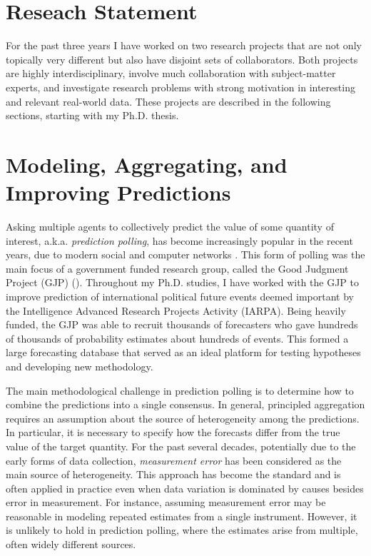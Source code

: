 \documentclass[10pt,twoside]{article}
\theoremstyle{definition}
\theoremstyle{definition}
\begin{document}
\pagestyle{myheadings}
\thispagestyle{empty}

\section*{Reseach Statement}
\vspace{1em}
For the past three years I have worked on two research projects that are not only topically very different but also have disjoint sets of collaborators. Both projects are highly interdisciplinary, involve much collaboration with subject-matter experts, and investigate research problems with strong motivation in  interesting and relevant real-world data. These projects are described in the following sections, starting with my Ph.D. thesis.

 \vspace{-0.8em}
\section{Modeling, Aggregating, and Improving Predictions}  \vspace{-0.8em}
Asking multiple agents to collectively predict the value of some quantity of interest, a.k.a. \textit{prediction polling}, has become increasingly popular in the recent years, due to modern social and computer networks \citep{goel2010prediction, mellers2014psychological}.
This form of polling was the main focus of a government funded research group, called the Good Judgment Project (GJP) (\citealt{ungar2012good, mellers2014psychological}). Throughout my Ph.D. studies, I have worked with the GJP to improve prediction of international political future events deemed important by the Intelligence Advanced Research Projects Activity (IARPA). 
Being heavily funded, the GJP was able to recruit thousands of forecasters who gave hundreds of thousands of probability estimates about hundreds of events. This formed a large forecasting database that served as an ideal platform for testing hypotheses and developing new methodology. 


The main methodological challenge in prediction polling is to determine how to combine the predictions into a single consensus. In general, principled aggregation requires an assumption about the source of heterogeneity among the predictions.
In particular, it is necessary to specify how the forecasts differ from the true value of the target quantity.
 For the past several decades, potentially due to the early forms of data collection, \textit{measurement error} has been considered as the main source of heterogeneity. This approach has become the standard and is often applied in practice even when data variation is dominated  by causes besides error in measurement. For instance, assuming measurement error may be reasonable in modeling repeated estimates from a single instrument. However, it is unlikely to hold in prediction polling, where the estimates arise from multiple, often widely different sources. 
\end{document}
